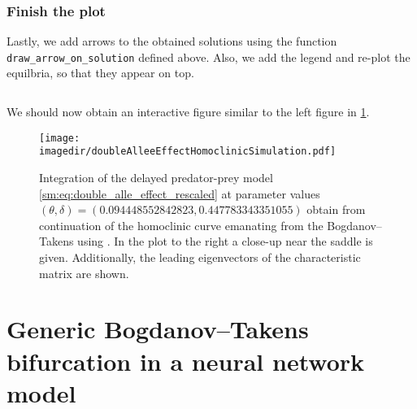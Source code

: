 \subsubsection{Finish the plot}
Lastly, we add arrows to the obtained solutions using the function
\texttt{draw_arrow_on_solution} defined above. Also, we add the
legend and re-plot the equilbria, so that they appear on top.
\inputminted[firstline=149, lastline=161]{julia}{\pathToJuliaFiles/predator_prey_simulation_article.jl}
We should now obtain an interactive figure similar to the left figure in \cref{sm:fig:doubleAlleeEffectHomoclinicSimulation}.
%
\begin{figure}[!ht]
    \centering
    \texttt{[image: \\imagedir/doubleAlleeEffectHomoclinicSimulation.pdf]}
    \caption{Integration of the delayed predator-prey model
        \cref{sm:eq:double_alle_effect_rescaled} at parameter values $(\theta,
        \delta) = (0.094448552842823, 0.447783343351055)$ obtain from
        continuation of the homoclinic curve emanating from the
        Bogdanov--Takens using \DDEBIFTOOL. In the plot to the right
        a close-up near the saddle is given. Additionally, the 
        leading eigenvectors of the characteristic matrix
        are shown.}
    \label{sm:fig:doubleAlleeEffectHomoclinicSimulation}
\end{figure}


\section[Bogdanov--Takens bifurcation in a neural network model]
        {Generic Bogdanov--Takens bifurcation in a neural network model}

